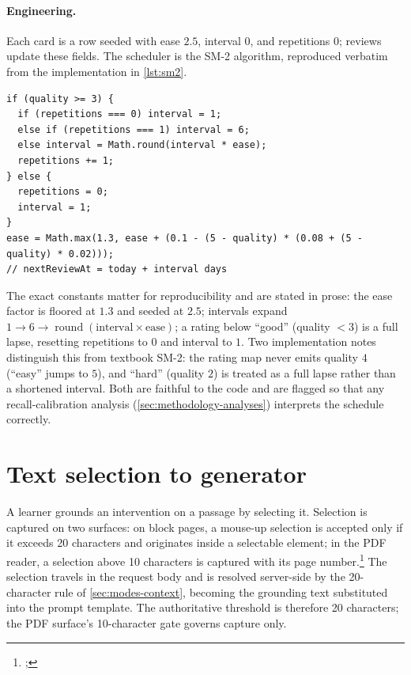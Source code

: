 \paragraph{Engineering.} Each card is a  row
seeded with ease $2.5$, interval $0$, and repetitions $0$; reviews update
these fields. The scheduler is the SM-2 algorithm, reproduced verbatim
from the implementation in \cref{lst:sm2}.

\begin{lstlisting}[caption={SM-2 update, verbatim from
\code{utils/sm2-algorithm.ts}. Rating map: again=1, hard=2, good=3,
easy=5.}, label={lst:sm2}]
if (quality >= 3) {
  if (repetitions === 0) interval = 1;
  else if (repetitions === 1) interval = 6;
  else interval = Math.round(interval * ease);
  repetitions += 1;
} else {
  repetitions = 0;
  interval = 1;
}
ease = Math.max(1.3, ease + (0.1 - (5 - quality) * (0.08 + (5 - quality) * 0.02)));
// nextReviewAt = today + interval days
\end{lstlisting}

The exact constants matter for reproducibility and are stated in prose:
the ease factor is floored at $1.3$ and seeded at $2.5$; intervals expand
$1 \rightarrow 6 \rightarrow \operatorname{round}(\text{interval} \times
\text{ease})$; a rating below ``good'' (quality $<3$) is a full lapse,
resetting repetitions to $0$ and interval to $1$. Two implementation
notes distinguish this from textbook SM-2: the rating map never emits
quality $4$ (``easy'' jumps to $5$), and ``hard'' (quality $2$) is treated
as a full lapse rather than a shortened interval. Both are faithful to
the code and are flagged so that any recall-calibration analysis
(\cref{sec:methodology-analyses}) interprets the schedule correctly.

\section{Text selection to generator}
\label{sec:interventions-selection}

A learner grounds an intervention on a passage by selecting it. Selection
is captured on two surfaces: on block pages, a mouse-up selection is
accepted only if it exceeds 20 characters and originates inside a
selectable element; in the PDF reader, a selection above 10 characters is
captured with its page
number.\footnote{;
} The selection travels in the request body and is
resolved server-side by the 20-character rule of
\cref{sec:modes-context}, becoming the grounding text substituted into the
prompt template. The authoritative threshold is therefore 20 characters;
the PDF surface's 10-character gate governs capture only.

